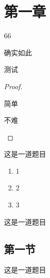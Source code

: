 \documentclass{xdyy-notes}
\begin{document}
\maketitle

\frontmatter

\begin{preface}
  \zhlipsum[1-3]
\end{preface}

\tableofcontents

\mainmatter

\chapter{第一章}
\begin{definition}
  66
\end{definition}

\begin{remark}
  确实如此
\end{remark}
\begin{timelog}[date = {2022-02-24}]
  测试
\end{timelog}
\begin{proof}
  \begin{necessity}
    简单
  \end{necessity}

  \begin{sufficiency}
    不难
    \qedhere
  \end{sufficiency}
\end{proof}


\begin{exercise}
  这是一道题目
  \begin{enumerate}
    \item 1
    \item 2
    \item 3
  \end{enumerate}
\end{exercise}

\begin{exercise}
  这是一道题目
\end{exercise}

\section{第一节}

\begin{exercise}
  这是一道题目
\end{exercise}
\end{document}
